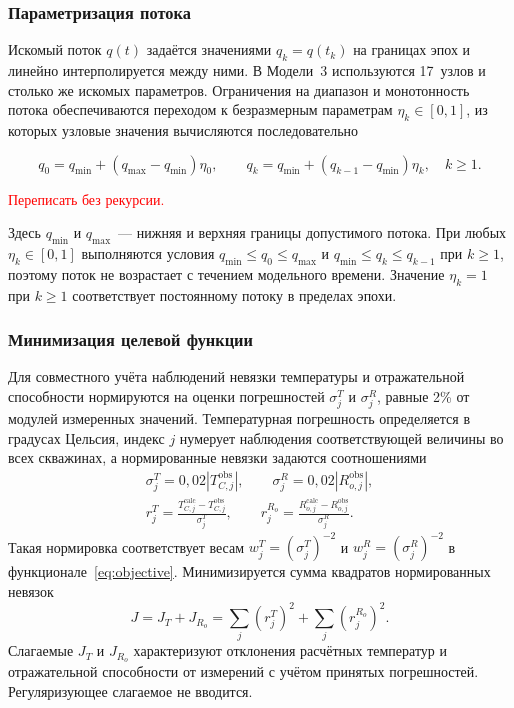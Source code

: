 \subsubsection{Параметризация потока}

Искомый поток $q(t)$ задаётся значениями $q_k=q(t_k)$ на границах эпох и линейно интерполируется между ними. В Модели~3 используются 17~узлов и столько же искомых параметров. Ограничения на диапазон и монотонность потока обеспечиваются переходом к безразмерным параметрам $\eta_k\in[0,1]$, из которых узловые значения вычисляются последовательно

\begin{equation}
 q_0 = q_{\min} + (q_{\max} - q_{\min})\eta_0,\qquad
 q_k = q_{\min} + (q_{k-1} - q_{\min})\eta_k,\quad k \geq 1.
\end{equation}

\textcolor{red}{Переписать без рекурсии.}

Здесь $q_{\min}$ и $q_{\max}$~--- нижняя и верхняя границы допустимого потока. При любых $\eta_k\in[0,1]$ выполняются условия $q_{\min}\leq q_0\leq q_{\max}$ и $q_{\min}\leq q_k\leq q_{k-1}$ при $k\geq1$, поэтому поток не возрастает с течением модельного времени. Значение $\eta_k=1$ при $k\geq1$ соответствует постоянному потоку в пределах эпохи.

\subsubsection{Минимизация целевой функции}

Для совместного учёта наблюдений невязки температуры и отражательной способности нормируются на оценки погрешностей $\sigma_j^T$ и $\sigma_j^R$, равные 2\% от модулей измеренных значений. Температурная погрешность определяется в градусах Цельсия, индекс $j$ нумерует наблюдения соответствующей величины во всех скважинах, а нормированные невязки задаются соотношениями
\begin{gather}
 \sigma_j^T = 0{,}02\left|T_{C,j}^{\mathrm{obs}}\right|,\qquad
 \sigma_j^R = 0{,}02\left|R_{o,j}^{\mathrm{obs}}\right|,\\
 r_j^T = \frac{T_{C,j}^{\mathrm{calc}} - T_{C,j}^{\mathrm{obs}}}{\sigma_j^T},\qquad
 r_j^{R_o} = \frac{R_{o,j}^{\mathrm{calc}} - R_{o,j}^{\mathrm{obs}}}{\sigma_j^R}.
 \label{eq:normalized-residuals}
\end{gather}
Такая нормировка соответствует весам $w_j^T = (\sigma_j^T)^{-2}$ и $w_j^R = (\sigma_j^R)^{-2}$ в функционале~\eqref{eq:objective}. Минимизируется сумма квадратов нормированных невязок
\begin{equation}
 J = J_T + J_{R_o} = \sum_j (r_j^T)^2 + \sum_j (r_j^{R_o})^2.
\end{equation}
Слагаемые $J_T$ и $J_{R_o}$ характеризуют отклонения расчётных температур и отражательной способности от измерений с учётом принятых погрешностей. Регуляризующее слагаемое не вводится.

